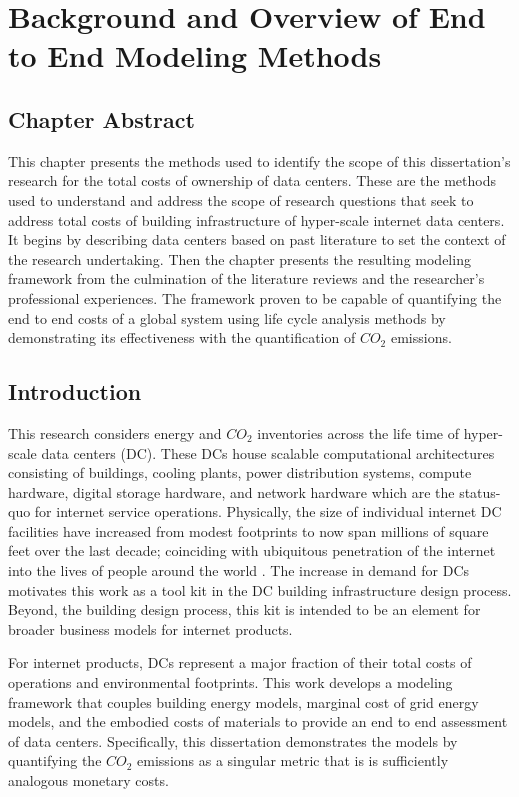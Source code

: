 \chapter{Background and Overview of End to End Modeling Methods}

\section{Chapter Abstract}

This chapter presents the methods used to identify the scope of this dissertation's research for the total costs of ownership of data centers. These are the methods used to understand and address the scope of research questions that seek to address total costs of building infrastructure of hyper-scale internet data centers. It begins by describing data centers based on past literature to set the context of the research undertaking. Then the chapter presents the resulting modeling framework from the culmination of the literature reviews and the researcher's professional experiences. The framework proven to be capable of quantifying the end to end costs of a global system using life cycle analysis methods by demonstrating its effectiveness with the quantification of $CO_2$ emissions. 

\section{Introduction}

    This research considers energy and $CO_2$ inventories across the life time of hyper-scale data centers (DC). These DCs house scalable computational architectures consisting of buildings, cooling plants, power distribution systems, compute hardware, digital storage hardware, and network hardware which are the status-quo for internet service operations. Physically, the size of individual internet DC facilities have increased from modest footprints to now span millions of square feet over the last decade; coinciding with ubiquitous penetration of the internet into the lives of people around the world . The increase in demand for DCs motivates this work as a tool kit in the DC building infrastructure design process. Beyond, the building design process, this kit is intended to be an element for broader business models for internet products.
    
    For internet products, DCs represent a major fraction of their total costs of operations and environmental footprints.  This work develops a modeling framework that couples building energy models, marginal cost of grid energy models, and the embodied costs of materials to provide an end to end assessment of data centers. Specifically, this dissertation demonstrates the models by quantifying the $CO_2$ emissions as a singular metric that is is sufficiently analogous monetary costs.
    

